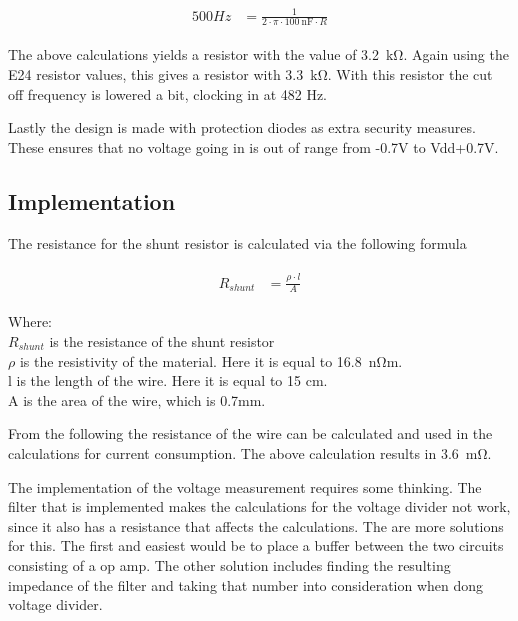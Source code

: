 \begin{align}
	\begin{split}
		500Hz &= \frac{1}{2 \cdot \pi \cdot \SI{100}{\nano \farad} \cdot R} 
	\end{split}
\end{align}

The above calculations yields a resistor with the value of \SI{3.2}{\kilo \ohm}. Again using the E24 resistor values, this gives a resistor with \SI{3.3}{\kilo \ohm}. With this resistor the cut off frequency is lowered a bit, clocking in at 482 Hz.

Lastly the design is made with protection diodes as extra security measures. These ensures that no voltage going in is out of range from -0.7V to Vdd+0.7V. 

\subsection{Implementation}
The resistance for the shunt resistor is calculated via the following formula

\begin{align}
	\begin{split}
		R_{shunt} &= \frac{\rho \cdot l}{A}
	\end{split}
\end{align}

Where:\\
$R_{shunt}$ is the resistance of the shunt resistor\\
$\rho$ is the resistivity of the material. Here it is equal to \SI{16.8}{\nano \ohm}m.\\
l is the length of the wire. Here it is equal to 15 cm.\\
A is the area of the wire, which is 0.7mm.

From the following the resistance of the wire can be calculated and used in the calculations for current consumption. The above calculation results in \SI{3.6}{\milli \ohm}.

The implementation of the voltage measurement requires some thinking. The filter that is implemented makes the calculations for the voltage divider not work, since it also has a resistance that affects the calculations. The are more solutions for this. The first and easiest would be to place a buffer between the two circuits consisting of a op amp. The other solution includes finding the resulting impedance of the filter and taking that number into consideration when dong voltage divider. 